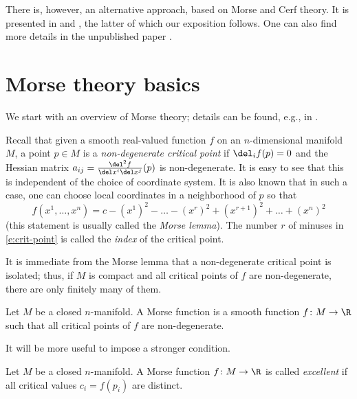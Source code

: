 There is, however, an alternative approach, based on Morse and Cerf theory.
It is presented in \cite{moore-segal} and \cite[Lecture~23]{freed-bordism},
the latter of which our exposition follows. One can also find more details
in the unpublished paper \cite{gay-wehrheim-woodward}.

\section{Morse theory basics}\label{s:morse}

We start with an overview of Morse theory; details can be found, e.g., in
\cite{matsumoto}.

Recall that given a smooth real-valued function $f$ on an $n$-dimensional
manifold $M$, a point $p\in M$ is a \emph{non-degenerate critical point}
 if
$\del_i f (p)=0$ and the Hessian matrix
$a_{ij}=\frac{\del^2 f}{\del x^i \del x^j}(p)$ is non-degenerate. It is easy to
see that this is independent of the choice of coordinate system. It is also
known that in such a case, one can choose local coordinates in a neighborhood
of $p$ so that
\begin{equation}\label{e:crit-point}
  f(x^1, \dots, x^n)=c-(x^1)^2 -\dots -(x^r)^2
  + (x^{r+1})^2+ \dots + (x^n)^2
\end{equation}
(this statement is usually called the \emph{Morse lemma}).
The number $r$ of minuses in \eqref{e:crit-point} is called the \emph{index}
of the critical point.

It is immediate from the Morse lemma that a non-degenerate critical point
is isolated; thus, if $M$ is compact and all critical points of $f$ are
non-degenerate, there are only finitely many of them.

\begin{definition}\label{d:morse_function}
  Let $M$ be a closed $n$-manifold. A Morse function is a
  smooth function $f\colon M\to \R$ such that all critical points
  of $f$ are non-degenerate.
\end{definition}

It will be more useful to impose a stronger condition.

\begin{definition}\label{d:morse_function2}
  Let $M$ be a closed $n$-manifold. A Morse function $f\colon M\to \R$
  is called \emph{excellent} if all critical
  values $c_i=f(p_i)$ are distinct.
\end{definition}


